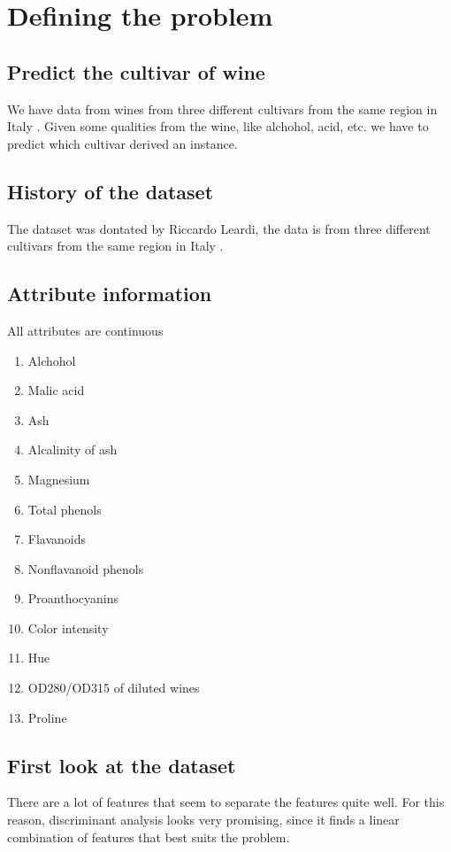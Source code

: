 \chapter{Defining the problem}

\section{Predict the cultivar of wine}
We have data from wines from three different cultivars from the same region in Italy \cite{info}. Given some qualities from the wine, like alchohol, acid, etc. we have to predict which cultivar derived an instance.

\section{History of the dataset}
The dataset was dontated by Riccardo Leardi, the data is from three different cultivars from the same region in Italy \cite{info}.

\section{Attribute information}
All attributes are continuous
\begin{enumerate}
    \item Alchohol 
    \item Malic acid
    \item Ash
    \item Alcalinity of ash
    \item Magnesium
    \item Total phenols 
    \item Flavanoids
    \item Nonflavanoid phenols
    \item Proanthocyanins 
    \item Color intensity 
    \item Hue 
    \item OD280/OD315 of diluted wines 
    \item Proline
\end{enumerate}

\section{First look at the dataset}
There are a lot of features that seem to separate the features quite well. For this reason, discriminant analysis looks very promising, since it finds a linear combination of features that best suits the problem.

